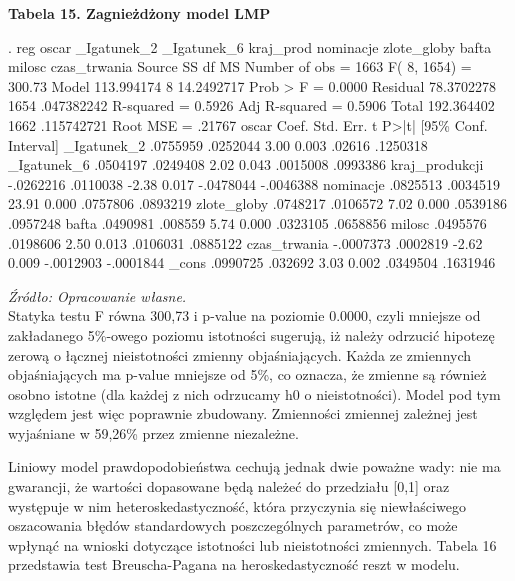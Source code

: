 \textbf{Tabela 15. Zagnieżdżony model LMP}
\begin{stlog}	

. reg oscar _Igatunek_2 _Igatunek_6 kraj_prod nominacje zlote_globy bafta milosc czas_trwania
{\smallskip}
      Source {\VBAR}       SS       df       MS              Number of obs =    1663
           F(  8,  1654) =  300.73
       Model {\VBAR}  113.994174     8  14.2492717           Prob > F      =  0.0000
    Residual {\VBAR}  78.3702278  1654  .047382242           R-squared     =  0.5926
           Adj R-squared =  0.5906
       Total {\VBAR}  192.364402  1662  .115742721           Root MSE      =  .21767
{\smallskip}
         oscar {\VBAR}      Coef.   Std. Err.      t    P>|t|     [95\% Conf. Interval]
   _Igatunek_2 {\VBAR}   .0755959   .0252044     3.00   0.003       .02616    .1250318
   _Igatunek_6 {\VBAR}   .0504197   .0249408     2.02   0.043     .0015008    .0993386
kraj_produkcji {\VBAR}  -.0262216   .0110038    -2.38   0.017    -.0478044   -.0046388
     nominacje {\VBAR}   .0825513   .0034519    23.91   0.000     .0757806    .0893219
   zlote_globy {\VBAR}   .0748217   .0106572     7.02   0.000     .0539186    .0957248
         bafta {\VBAR}   .0490981    .008559     5.74   0.000     .0323105    .0658856
        milosc {\VBAR}   .0495576   .0198606     2.50   0.013     .0106031    .0885122
  czas_trwania {\VBAR}  -.0007373   .0002819    -2.62   0.009    -.0012903   -.0001844
         _cons {\VBAR}   .0990725    .032692     3.03   0.002     .0349504    .1631946

\end{stlog}

\textit{\footnotesize{Źródło: Opracowanie własne.}} \\

Statyka testu F równa 300,73 i p-value na poziomie 0.0000, czyli mniejsze od zakładanego 5\%-owego poziomu istotności sugerują, iż należy odrzucić hipotezę zerową o łącznej nieistotności zmienny objaśniających. Każda ze zmiennych objaśniających ma p-value mniejsze od 5\%, co oznacza, że zmienne są również osobno istotne (dla każdej z nich odrzucamy h0 o nieistotności). Model pod tym względem jest więc poprawnie zbudowany. Zmienności zmiennej zależnej jest wyjaśniane w 59,26\% przez zmienne niezależne.

Liniowy  model prawdopodobieństwa cechują jednak dwie poważne wady: nie ma gwarancji, że wartości dopasowane będą należeć do przedziału [0,1] oraz występuje w nim heteroskedastyczność, która przyczynia się niewłaściwego oszacowania błędów standardowych poszczególnych parametrów, co może wpłynąć na wnioski dotyczące istotności lub nieistotności zmiennych. Tabela 16 przedstawia test Breuscha-Pagana na heroskedastyczność reszt w modelu.
 
